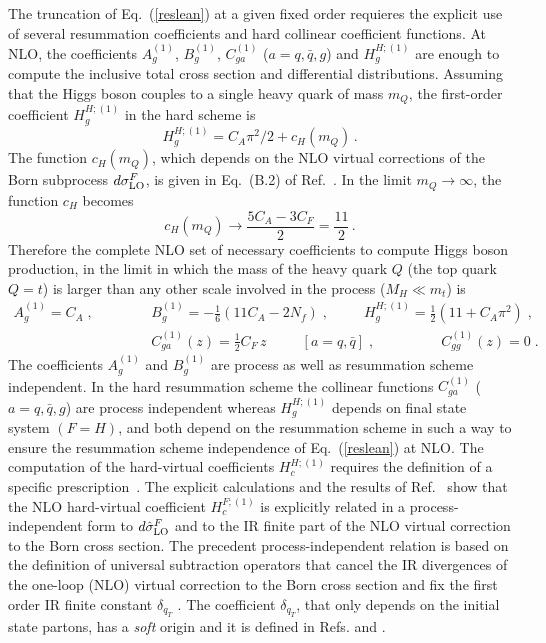 \documentclass[12pt]{article}
\def\beeq{\begin{eqnarray}}
\def\eeeq{\end{eqnarray}}
\def\nn{\nonumber}
\newcommand\f[2]{\frac{#1}{#2}}
\def\to{\rightarrow}
\begin{document}
The truncation of Eq.~(\ref{reslean}) at a given fixed order requieres the explicit use of several resummation coefficients and hard collinear coefficient functions.
At NLO, the coefficients $A^{(1)}_{g}$, $B^{(1)}_{g}$, $C^{(1)}_{ga}$ ($a=q,{\bar q},g$) and $H^{H;(1)}_{g}$ are enough to compute the inclusive total cross section and differential distributions. Assuming that the Higgs boson couples to a single heavy quark of mass $m_Q$, the first-order coefficient $H_g^{H;(1)}$ in the hard scheme is~\cite{Catani:2013tia}
\begin{equation}
\label{H1g}
H_g^{H;(1)}=C_A\pi^2/2+c_H(m_Q)\, .
\end{equation}
The function $c_H(m_Q)$, which depends on the NLO virtual corrections of the Born subprocess $d\sigma^{F}_{\rm LO}$, is given in Eq.~(B.2) of Ref.~\cite{Spira:1995rr}. In the limit $m_Q\to \infty$, the function $c_H$ becomes
\begin{equation}
c_H(m_Q)\longrightarrow\f{5C_A-3C_F}{2}=\f{11}{2}\, .
\end{equation}
Therefore the complete NLO set of necessary coefficients to compute Higgs boson production, in the limit in which the mass of the heavy quark $Q$ (the top quark $Q=t$) is larger than any other scale involved in the process ($M_{H}\ll m_{t}$) is
\beeq
A^{(1)}_{g}=C_{A}\;,\;\;\;\;\;\;\;\;\;&&B^{(1)}_{g}=- \f{1}{6} \left( 11 C_A - 2 N_f \right)\;,\;\;\;\;\;\;\;\;\;H^{H;(1)}_{g}=\f{1}{2}(11+C_{A}\pi^{2})\;,\nn\\
&&\!\!\!\!\!\!\!\!\!\!\!\!\!\!\!\!\!\!\!\!\!\!\!\!\!\!\!\!\!\!\!\!\!C^{(1)}_{ga}(z)=\f{1}{2}C_F\, z\;\;\;\;\;\;\;\;\;\left[a=q,{\bar q}\right]\;,\;\;\;\;\;\;\;\;\;\;\;\;\;\;\;\;\;C^{(1)}_{gg}(z)=0\;.
\eeeq
The coefficients $A^{(1)}_{g}$ and $B^{(1)}_{g}$ are process as well as resummation scheme independent. In the hard resummation scheme the collinear functions $C^{(1)}_{ga}$ ($a=q,{\bar q},g$) are process independent whereas $H^{H;(1)}_{g}$ depends on final state system $(F=H)$, and both depend on the resummation scheme in such a way to ensure the resummation scheme independence of Eq.~(\ref{reslean}) at NLO. The computation of the hard-virtual coefficients $H^{H;(1)}_{c}$ requires the definition of a specific prescription~\cite{deFlorian:2001zd}. The explicit calculations and the results of Ref.~\cite{deFlorian:2001zd} show that the NLO hard-virtual coefficient $H^{F;(1)}_{c}$ is explicitly related in a process-independent form to $d{\hat \sigma}^{F}_{\rm LO}$ and to the IR finite part of the NLO virtual correction to the Born cross section. The precedent process-independent relation is based on the definition of universal subtraction operators that cancel the IR divergences of the one-loop (NLO) virtual correction to the Born cross section and fix the first order IR finite constant $\delta_{q_{T}}$ \cite{Catani:2013tia}. The coefficient $\delta_{q_{T}}$, that only depends on the initial state partons, has a \textit{soft} origin and it is defined in Refs. \cite{deFlorian:2001zd} and \cite{Catani:2013tia}.
\end{document}
